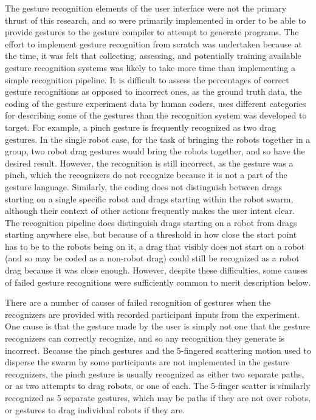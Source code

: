 The gesture recognition elements of the user interface were not the primary thrust of this research, and so were primarily implemented in order to be able to provide gestures to the gesture compiler to attempt to generate programs. 
The effort to implement gesture recognition from scratch was undertaken because at the time, it was felt that collecting, assessing, and potentially training available gesture recognition systems was likely to take more time than implementing a simple recognition pipeline. 
It is difficult to assess the percentages of correct gesture recognitions as opposed to incorrect ones, as the ground truth data, the coding of the gesture experiment data by human coders, uses different categories for describing some of the gestures than the recognition system was developed to target. 
For example, a pinch gesture is frequently recognized as two drag gestures. 
In the single robot case, for the task of bringing the robots together in a group, two robot drag gestures would bring the robots together, and so have the desired result. 
However, the recognition is still incorrect, as the gesture was a pinch, which the recognizers do not recognize because it is not a part of the gesture language. 
Similarly, the coding does not distinguish between drags starting on a single specific robot and drags starting within the robot swarm, although their context of other actions frequently makes the user intent clear. 
The recognition pipeline does distinguish drags starting on a robot from drags starting anywhere else, but because of a threshold in how close the start point has to be to the robots being on it, a drag that visibly does not start on a robot (and so may be coded as a non-robot drag) could still be recognized as a robot drag because it was close enough. 
However, despite these difficulties, some causes of failed gesture recognitions were sufficiently common to merit description below. 

There are a number of causes of failed recognition of gestures when the recognizers are provided with recorded participant inputs from the experiment. 
One cause is that the gesture made by the user is simply not one that the gesture recognizers can correctly recognize, and so any recognition they generate is incorrect. 
Because the pinch gestures and the 5-fingered scattering motion used to disperse the swarm by some participants are not implemented in the gesture recognizers, the pinch gesture is usually recognized as either two separate paths, or as two attempts to drag robots, or one of each. 
The 5-finger scatter is similarly recognized as 5 separate gestures, which may be paths if they are not over robots, or gestures to drag individual robots if they are. 

